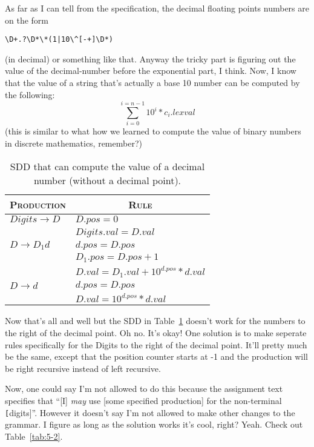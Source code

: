As far as I can tell from the specification, the decimal floating points numbers are on the form
\begin{verbatim}
\D+.?\D*\*(1|10\^[-+]\D*)
\end{verbatim}
(in decimal) or something like that.
Anyway the tricky part is figuring out the value of the decimal-number before the exponential part, I think.
Now, I know that the value of a string that's actually a base 10 number can be computed by the following:
\[ \sum_{i=0}^{i=n-1} 10^{i}*c_{i}.lexval \]
(this is similar to what how we learned to compute the value of binary numbers in discrete mathematics, remember?)
\begin{table}[H]
	\centering
	\begin{tabular}{l|l}
	\hline	\hline
	\textsc{Production}			& \multicolumn{1}{c}{\textsc{Rule}} \\ \hline
	$Digits\rightarrow D$& $D.pos = 0$ \\ 
						& $Digits.val = D.val$ \\\hline
	$D\rightarrow D_1d$	& $d.pos = D.pos$	\\
						& $D_1.pos = D.pos + 1$ \\
						& $D.val = D_1.val + 10^{d.pos}*d.val$ \\ \hline
	$D\rightarrow d$	& $d.pos = D.pos$	\\
						& $D.val = 10^{d.pos}*d.val$\\

	\hline
	\end{tabular}	
	\caption{SDD that can compute the value of a decimal number (without a decimal point).}
	\label{tab:5-1}
\end{table}

Now that's all and well but the SDD in Table~\ref{tab:5-1} doesn't work for the numbers to the right of the decimal point.
Oh no.
It's okay!
One solution is to make seperate rules specifically for the Digits to the right of the decimal point.
It'll pretty much be the same, except that the position counter starts at -1 and the production will be right recursive instead of left recursive.

Now, one could say I'm not allowed to do this because the assignment text specifies that ``[I] \emph{may} use [some specified production] for the non-terminal \texttt[digits]''.
However it doesn't say I'm not allowed to make other changes to the grammar.
I figure as long as the solution works it's cool, right?
Yeah.
Check out Table~\ref{tab:5-2}.

